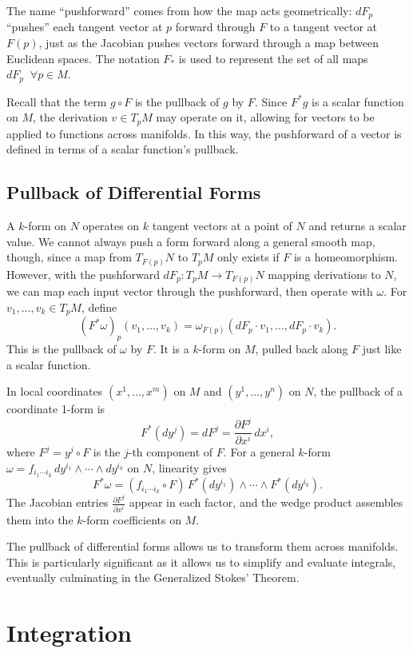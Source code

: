 \documentclass[12pt]{article}
\newcommand{\p}{\partial}
\begin{document}
The name ``pushforward'' comes from how the map acts geometrically: $dF_p$ ``pushes'' each tangent vector at $p$ forward through $F$ to a tangent vector at $F(p)$, just as the Jacobian pushes vectors forward through a map between Euclidean spaces. The notation $F_*$ is used to represent the set of all maps $dF_p \;\; \forall p \in M$.

Recall that the term $g \circ F$ is the pullback of $g$ by $F$. Since $F^{*}g$ is a scalar function on $M$, the derivation $v \in T_pM$ may operate on it, allowing for vectors to be applied to functions across manifolds. In this way, the pushforward of a vector is defined in terms of a scalar function's pullback.

\subsection{Pullback of Differential Forms}

A $k$-form on $N$ operates on $k$ tangent vectors at a point of $N$ and returns a scalar value. We cannot always push a form forward along a general smooth map, though, since a map from $T_{F(p)}N$ to $T_pM$ only exists if $F$ is a homeomorphism. However, with the pushforward $dF_p: T_pM \to T_{F(p)}N$ mapping derivations to $N$, we can map each input vector through the pushforward, then operate with $\omega$. For $v_1, \dots, v_k \in T_pM$, define
\[
(F^*\omega)_p(v_1, \dots, v_k) = \omega_{F(p)}(dF_p \cdot v_1, \dots, dF_p \cdot v_k).
\]
This is the pullback of $\omega$ by $F$. It is a $k$-form on $M$, pulled back along $F$ just like a scalar function.

In local coordinates $(x^1, \dots, x^m)$ on $M$ and $(y^1, \dots, y^n)$ on $N$, the pullback of a coordinate 1-form is
\[
F^*(dy^j) = dF^j = \frac{\p F^j}{\p x^i}\,dx^i,
\]
where $F^j = y^j \circ F$ is the $j$-th component of $F$. For a general $k$-form $\omega = f_{i_1 \cdots i_k}\, dy^{i_1} \wedge \cdots \wedge dy^{i_k}$ on $N$, linearity gives
\[
F^*\omega = (f_{i_1 \cdots i_k} \circ F)\, F^*(dy^{i_1}) \wedge \cdots \wedge F^*(dy^{i_k}).
\]
The Jacobian entries $\frac{\p F^j}{\p x^i}$ appear in each factor, and the wedge product assembles them into the $k$-form coefficients on $M$.

The pullback of differential forms allows us to transform them across manifolds. This is particularly significant as it allows us to simplify and evaluate integrals, eventually culminating in the Generalized Stokes' Theorem.

\section{Integration}
\end{document}
